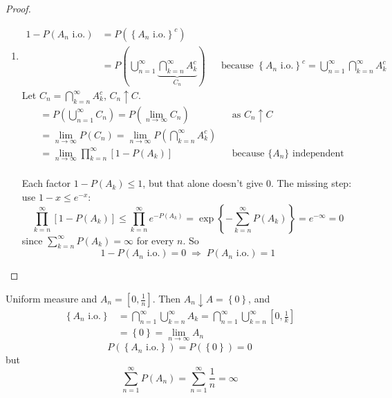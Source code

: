 \begin{reqnoproof}
\begin{theorem}
\begin{proof}
\begin{enumerate}[label=\roman*)]
            \item
            \begin{align*}
                1 - P(A_n \text{ i.o.}) &= P\left(\left\{A_n \text{ i.o.}\right\}^c\right)\\
                &= P\left(\bigcup_{n=1}^\infty \underbrace{\bigcap_{k=n}^\infty A_k^c}_{C_n}\right) & &\text{because } \left\{A_n \text{ i.o.}\right\}^c = \textstyle\bigcup_{n=1}^\infty\bigcap_{k=n}^\infty A_k^c
            \end{align*}
            Let $C_n = \bigcap_{k=n}^\infty A_k^c$, $C_n \uparrow C$.
            \begin{align*}
                &= P\left(\bigcup_{n=1}^\infty C_n\right) = P\left(\lim_{n\to\infty} C_n\right) & &\text{as } C_n \uparrow C\\
                &= \lim_{n\to\infty} P(C_n) = \lim_{n\to\infty} P\left(\bigcap_{k=n}^\infty A_k^c\right)\\
                &= \lim_{n\to\infty}\prod_{k=n}^\infty \left[1 - P(A_k)\right] & &\text{because $\{A_n\}$ independent}
            \end{align*}
            \\Each factor $1 - P(A_k) \leq 1$, but that alone doesn't give $0$. The missing step: use $1 - x \leq e^{-x}$:
            \[\prod_{k=n}^\infty\left[1 - P(A_k)\right] \leq \prod_{k=n}^\infty e^{-P(A_k)} = \exp\left\{-\sum_{k=n}^\infty P(A_k)\right\} = e^{-\infty} = 0\]
            since $\sum_{k=n}^\infty P(A_k) = \infty$ for every $n$. So
            \[1 - P(A_n \text{ i.o.}) = 0 \;\Rightarrow\; P(A_n \text{ i.o.}) = 1\]
        \end{enumerate}
    \end{proof}
\end{theorem}
\end{reqnoproof}

\begin{example}
    Uniform measure and $A_n = \left[0, \frac{1}{n}\right]$. Then $A_n \downarrow A = \left\{0\right\}$, and
    \begin{align*}
        \left\{A_n \text{ i.o.}\right\} &= \bigcap_{n=1}^\infty\bigcup_{k=n}^\infty A_k = \bigcap_{n=1}^\infty\bigcup_{k=n}^\infty\left[0, \frac{1}{k}\right]\\
        &= \left\{0\right\} = \lim_{n\to\infty} A_n
    \end{align*}
    \[P(\left\{A_n \text{ i.o.}\right\}) = P(\left\{0\right\}) = 0\]
    but
    \[\sum_{n=1}^\infty P(A_n) = \sum_{n=1}^\infty \frac{1}{n} = \infty\]
\end{example}

